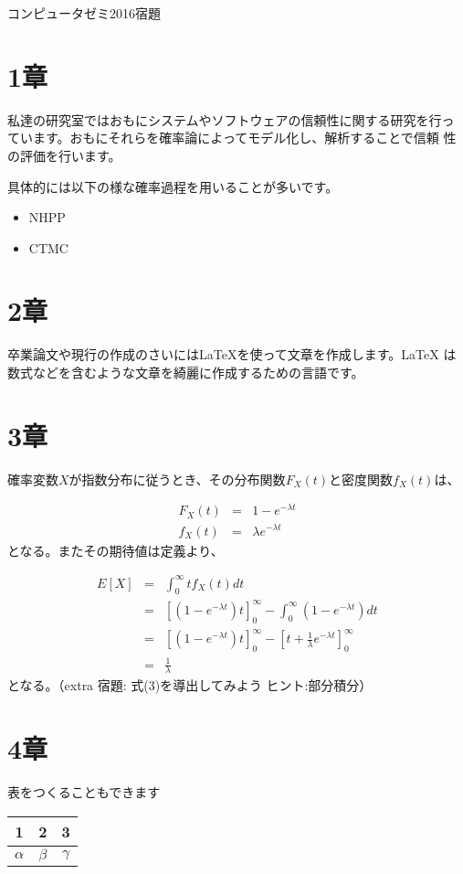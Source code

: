 \documentclass[a4paper,12pt]{article}
\begin{document}
\begin{center}
{\Large コンピュータゼミ2016宿題}
\end{center}
\section{1章}
私達の研究室ではおもにシステムやソフトウェアの信頼性に関する研究を行っ
ています。おもにそれらを確率論によってモデル化し、解析することで信頼
性の評価を行います。\par
  具体的には以下の様な確率過程を用いることが多いです。

\begin{itemize}
\item NHPP
\item CTMC
\end{itemize}

\section{2章}
卒業論文や現行の作成のさいには\LaTeX を使って文章を作成します。\LaTeX 
は数式などを含むような文章を綺麗に作成するための言語です。

\section{3章}
確率変数$X$が指数分布に従うとき、その分布関数$F_X(t)$と密度関数$f_X(t)$は、

\begin{eqnarray}
F_X(t)&=&1-e^{-\lambda t}\\
f_X(t)&=&\lambda e^{-\lambda t}
\end{eqnarray}
となる。またその期待値は定義より、

\begin{eqnarray}
E[X]&=&\int_0^{\infty} tf_X(t)dt\nonumber \\
&=&[(1-e^{-\lambda t})t]_0^{\infty}-\int_0^{\infty}(1-e^{-\lambda t})dt \nonumber \\
&=&[(1-e^{-\lambda t})t]_0^{\infty}-[t+\frac{1}{\lambda}e^{-\lambda t}]_0^{\infty} \nonumber \\
&=&\frac{1}{\lambda}
\end{eqnarray}
となる。（extra 宿題: 式(3)を導出してみよう ヒント:部分積分）

\newpage

\section{4章}
表をつくることもできます

\begin{table}[h]
\begin{center}
\begin{tabular}{|c|c|c|}
\hline
1 & 2 & 3 \\
\hline
$\alpha$ & $\beta$ & $\gamma$ \\
\hline
\end{tabular}
\end{center}
\end{table}
\end{document}
